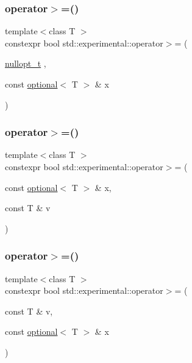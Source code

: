 \subsubsection{\texorpdfstring{operator$>$=()}{operator>=()}\hspace{0.1cm}{\footnotesize\ttfamily [3/9]}}
{\footnotesize\ttfamily template$<$class T $>$ \\
constexpr bool std\+::experimental\+::operator$>$= (\begin{DoxyParamCaption}\item[{\hyperlink{structstd_1_1experimental_1_1nullopt__t}{nullopt\+\_\+t}}]{,  }\item[{const \hyperlink{classstd_1_1experimental_1_1optional}{optional}$<$ T $>$ \&}]{x }\end{DoxyParamCaption})\hspace{0.3cm}{\ttfamily [noexcept]}}

\mbox{\label{namespacestd_1_1experimental_a3209ada3ae8542ffbdfcc7e7d35f19a5}} 
\subsubsection{\texorpdfstring{operator$>$=()}{operator>=()}\hspace{0.1cm}{\footnotesize\ttfamily [4/9]}}
{\footnotesize\ttfamily template$<$class T $>$ \\
constexpr bool std\+::experimental\+::operator$>$= (\begin{DoxyParamCaption}\item[{const \hyperlink{classstd_1_1experimental_1_1optional}{optional}$<$ T $>$ \&}]{x,  }\item[{const T \&}]{v }\end{DoxyParamCaption})}

\mbox{\label{namespacestd_1_1experimental_a0e2303b05ab975b9dd1a53c198bf2e45}} 
\subsubsection{\texorpdfstring{operator$>$=()}{operator>=()}\hspace{0.1cm}{\footnotesize\ttfamily [5/9]}}
{\footnotesize\ttfamily template$<$class T $>$ \\
constexpr bool std\+::experimental\+::operator$>$= (\begin{DoxyParamCaption}\item[{const T \&}]{v,  }\item[{const \hyperlink{classstd_1_1experimental_1_1optional}{optional}$<$ T $>$ \&}]{x }\end{DoxyParamCaption})}


